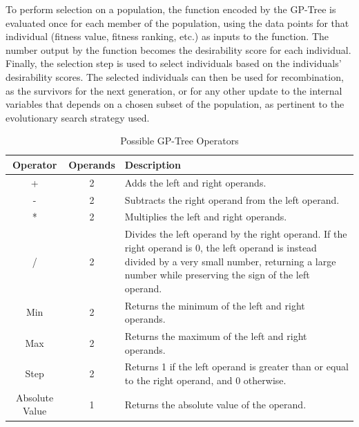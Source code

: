 \documentclass[sigconf]{acmart}
\begin{document}
To perform selection on a population, the function encoded by the GP-Tree is evaluated once for each member of the population, using the data points for that individual (fitness value, fitness ranking, etc.) as inputs to the function. The number output by the function becomes the desirability score for each individual. Finally, the selection step is used to select individuals based on the individuals' desirability scores. The selected individuals can then be used for recombination, as the survivors for the next generation, or for any other update to the internal variables that depends on a chosen subset of the population, as pertinent to the evolutionary search strategy used.

\begin{table}
	\centering
	\caption{Possible GP-Tree Operators}
	\label{tab:gp-operators}
	\begin{tabular}{cc|p{4.5cm}}
		\toprule
		Operator & Operands & Description\\
		\midrule
		+ & 2 & Adds the left and right operands. \\
		\hline
		- & 2 & Subtracts the right operand from the left operand.\\    
		\hline
		* & 2 & Multiplies the left and right operands.\\  
		\hline
		/ & 2 & Divides the left operand by the right operand. If the right operand is 0, the left operand is instead divided by a very small number, returning a large number while preserving the sign of the left operand.\\      
		\hline
		Min & 2 & Returns the minimum of the left and right operands.\\
		\hline
		Max & 2 & Returns the maximum of the left and right operands.\\
		\hline
		Step & 2 & Returns 1 if the left operand is greater than or equal to the right operand, and 0 otherwise.\\
		\hline
		Absolute Value & 1 & Returns the absolute value of the operand.\\    
		
		\bottomrule
	\end{tabular}
\end{table}
\end{document}
